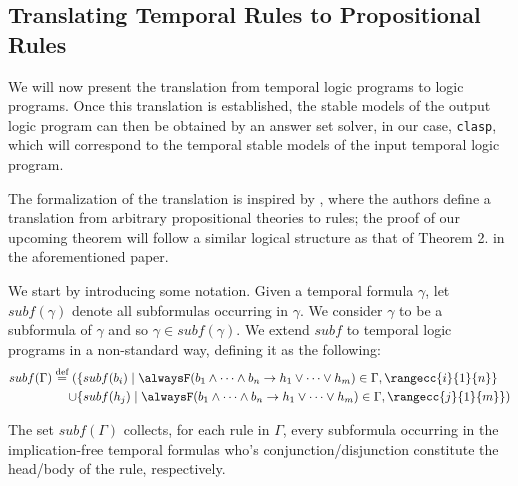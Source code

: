 \subsection{Translating Temporal Rules to Propositional Rules}

We will now present the translation from temporal logic programs to
logic programs. Once this translation is established, the stable
models of the output logic program can then be obtained by an answer
set solver, in our case, \verb|clasp|, which will correspond to the
temporal stable models of the input temporal logic program.

The formalization of the translation is inspired by
\cite[p. 9]{capeva05a}, where the authors define a translation from
arbitrary propositional theories to rules; the proof of our upcoming
theorem will follow a similar logical structure as that of Theorem
2. in the aforementioned paper.

We start by introducing some notation.  Given a temporal formula
$\gamma$, let $subf(\gamma)$ denote all subformulas occurring in
$\gamma$. We consider $\gamma$ to be a subformula of $\gamma$ and so
$\gamma \in subf(\gamma)$. We extend $subf$ to temporal logic programs
in a non-standard way, defining it as the following:
\begin{align*}
subf(\Gamma) \defeq (&\{ subf(b_i) \mid \temprulelong \in \Gamma, \rangecc{i}{1}{n} \}\\
  \cup &\{ subf(h_j) \mid \temprulelong \in \Gamma,\rangecc{j}{1}{m} \})
\end{align*}

The set $subf(\Gamma)$ collects, for each rule in $\Gamma$, every
subformula occurring in the implication-free temporal
formulas who's conjunction/disjunction constitute the head/body of the
rule, respectively.

